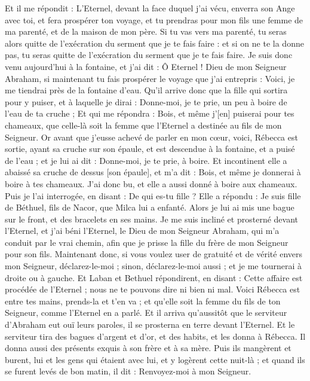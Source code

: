 \begin{multicols}{2}
Et il me répondit : L'Eternel, devant la face duquel j'ai vécu, enverra son Ange avec toi, et fera prospérer ton voyage, et tu prendras pour mon fils une femme de ma parenté, et de la maison de mon père.
Si tu vas vers ma parenté, tu seras alors quitte de l'exécration du serment que je te fais faire : et si on ne te la donne pas, tu seras quitte de l'exécration du serment que je te fais faire.
Je suis donc venu aujourd'hui à la fontaine, et j'ai dit : Ô Eternel ! Dieu de mon Seigneur Abraham, si maintenant tu fais prospérer le voyage que j'ai entrepris :
Voici, je me tiendrai près de la fontaine d'eau. Qu'il arrive donc que la fille qui sortira pour y puiser, et à laquelle je dirai : Donne-moi, je te prie, un peu à boire de l'eau de ta cruche ;
Et qui me répondra : Bois, et même j'[en] puiserai pour tes chameaux, que celle-là soit la femme que l'Eternel a destinée au fils de mon Seigneur.
Or avant que j'eusse achevé de parler en mon cœur, voici, Rébecca est sortie, ayant sa cruche sur son épaule, et est descendue à la fontaine, et a puisé de l'eau ; et je lui ai dit : Donne-moi, je te prie, à boire.
Et incontinent elle a abaissé sa cruche de dessus [son épaule], et m'a dit : Bois, et même je donnerai à boire à tes chameaux. J'ai donc bu, et elle a aussi donné à boire aux chameaux.
Puis je l'ai interrogée, en disant : De qui es-tu fille ? Elle a répondu : Je suis fille de Béthuel, fils de Nacor, que Milca lui a enfanté. Alors je lui ai mis une bague sur le front, et des bracelets en ses mains.
Je me suis incliné et prosterné devant l'Eternel, et j'ai béni l'Eternel, le Dieu de mon Seigneur Abraham, qui m'a conduit par le vrai chemin, afin que je prisse la fille du frère de mon Seigneur pour son fils.
Maintenant donc, si vous voulez user de gratuité et de vérité envers mon Seigneur, déclarez-le-moi ; sinon, déclarez-le-moi aussi ; et je me tournerai à droite ou à gauche.
Et Laban et Bethuel répondirent, en disant : Cette affaire est procédée de l'Eternel ; nous ne te pouvons dire ni bien ni mal.
Voici Rébecca est entre tes mains, prends-la et t'en va ; et qu'elle soit la femme du fils de ton Seigneur, comme l'Eternel en a parlé.
Et il arriva qu'aussitôt que le serviteur d'Abraham eut ouï leurs paroles, il se prosterna en terre devant l'Eternel.
Et le serviteur tira des bagues d'argent et d'or, et des habits, et les donna à Rébecca. Il donna aussi des présents exquis à son frère et à sa mère.
Puis ils mangèrent et burent, lui et les gens qui étaient avec lui, et y logèrent cette nuit-là ; et quand ils se furent levés de bon matin, il dit : Renvoyez-moi à mon Seigneur.

\end{multicols}
